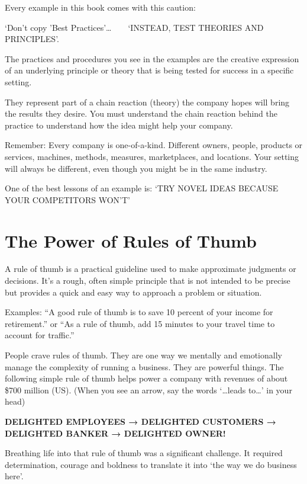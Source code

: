 \documentclass[
]{book}
\begin{document}
Every example in this book comes with this caution:

{`Don't copy 'Best Practices'}\ldots{} ~ ~ {`INSTEAD, TEST THEORIES AND PRINCIPLES'}.

The practices and procedures you see in the examples are the creative expression of an underlying principle or theory that is being tested for success in a specific setting.

They represent part of a chain reaction (theory) the company hopes will bring the results they desire. You must understand the chain reaction behind the practice to understand how the idea might help your company.

Remember: Every company is one-of-a-kind. Different owners, people, products or services, machines, methods, measures, marketplaces, and locations. Your setting will always be different, even though you might be in the same industry.

One of the best lessons of an example is: {`TRY NOVEL IDEAS BECAUSE YOUR COMPETITORS WON'T'}

\hypertarget{the-power-of-rules-of-thumb}{%
\section{The Power of Rules of Thumb}\label{the-power-of-rules-of-thumb}}

A rule of thumb is a practical guideline used to make approximate judgments or decisions. It's a rough, often simple principle that is not intended to be precise but provides a quick and easy way to approach a problem or situation.

Examples: ``A good rule of thumb is to save 10 percent of your income for retirement.'' or ``As a rule of thumb, add 15 minutes to your travel time to account for traffic.''

People crave rules of thumb. They are one way we mentally and emotionally manage the complexity of running a business. They are powerful things. The following simple rule of thumb helps power a company with revenues of about \$700 million (US). (When you see an arrow, say the words `\ldots leads to\ldots{}' in your head)

\textbf{DELIGHTED EMPLOYEES {→} DELIGHTED CUSTOMERS {→} DELIGHTED BANKER {→} DELIGHTED OWNER!}

Breathing life into that rule of thumb was a significant challenge. It required determination, courage and boldness to translate it into `the way we do business here'.
\end{document}

